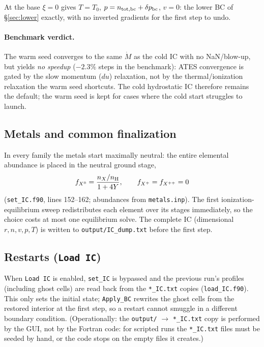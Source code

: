 \documentclass[english,a4paper]{my_memo}
\begin{document}
At the base $\xi = 0$ gives $T = T_0$, $p = n_{\rm tot,bc} + \delta p_{\rm bc}$,
$v = 0$: the lower BC of \S\ref{sec:lower} exactly, with no
inverted gradients for the first step to undo.

\paragraph{Benchmark verdict.}
The warm seed converges to the same $\dot M$ as the cold IC with no
NaN/blow-up, but yields \emph{no speedup} (${-}2.3\%$ steps in the
benchmark): ATES convergence is gated by the slow momentum ($du$)
relaxation, not by the thermal/ionization relaxation the warm seed
shortcuts. The cold hydrostatic IC therefore remains the default; the
warm seed is kept for cases where the cold start struggles to launch.

\subsection{Metals and common finalization}

In every family the metals start maximally neutral: the entire
elemental abundance is placed in the neutral ground stage,
\begin{equation}
f_{X^0} = \frac{n_X/n_{\rm H}}{1 + 4Y}, \qquad
f_{X^{+}} = f_{X^{++}} = 0
\end{equation}
(\texttt{set\_IC.f90}, lines 152--162; abundances from
\texttt{metals.inp}). The first ionization-equilibrium sweep
redistributes each element over its stages immediately, so the choice
costs at most one equilibrium solve. The complete IC (dimensional
$r, n, v, p, T$) is written to \texttt{output/IC\_dump.txt} before the
first step.

\subsection{Restarts (\texttt{Load IC})}
\label{sec:loadic}

When \texttt{Load IC} is enabled, \texttt{set\_IC} is bypassed and the
previous run's profiles (including ghost cells) are read back from the
\texttt{*\_IC.txt} copies (\texttt{load\_IC.f90}). This only sets the
initial state; \texttt{Apply\_BC} rewrites the ghost cells from the
restored interior at the first step, so a restart cannot smuggle in a
different boundary condition. (Operationally: the \texttt{output/}
$\to$ \texttt{*\_IC.txt} copy is performed by the GUI, not by the
Fortran code: for scripted runs the \texttt{*\_IC.txt} files must
be seeded by hand, or the code stops on the empty files it creates.)
\end{document}
